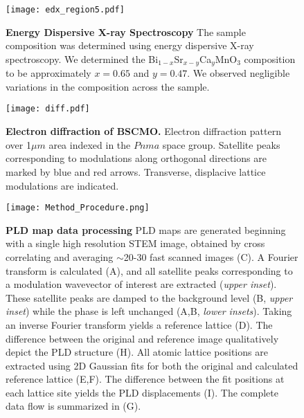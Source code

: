 \documentclass[12pt]{article}
\begin{document}
\clearpage

\begin{figure}
  \texttt{[image: edx\_region5.pdf]}
  \caption{\textbf{Energy Dispersive X-ray Spectroscopy} 
The sample composition was determined using energy dispersive X-ray spectroscopy. We determined the Bi$_{1-x}$Sr$_{x-y}$Ca$_{y}$MnO$_{3}$ composition to be approximately $x=0.65$ and $y=0.47$.  We observed negligible variations in the composition across the sample.}
  \label{F:edx}
\end{figure}

\clearpage

\begin{figure}
  \texttt{[image: diff.pdf]}
  \caption{\textbf{Electron diffraction of BSCMO.} 
Electron diffraction pattern over 1$\mu m$ area indexed in the $Pnma$ space group.
Satellite peaks corresponding to modulations along orthogonal directions are marked by blue and red arrows.
Transverse, displacive lattice modulations are indicated.}
\label{F:Diffraction}
\end{figure}

\clearpage

\begin{figure}
  \texttt{[image: Method\_Procedure.png]}
  \caption{\textbf{PLD map data processing} 
PLD maps are generated beginning with a single high resolution STEM image, obtained by cross correlating and averaging $\sim$20-30 fast scanned images (C).  
A Fourier transform is calculated (A), and all satellite peaks corresponding to a modulation wavevector of interest are extracted (\textit{upper inset}).  
These satellite peaks are damped to the background level (B, \textit{upper inset}) while the phase is left unchanged (A,B, \textit{lower insets}).
Taking an inverse Fourier transform yields a reference lattice (D).
The difference between the original and reference image qualitatively depict the PLD structure (H).
All atomic lattice positions are extracted using 2D Gaussian fits for both the original and calculated reference lattice (E,F).
The difference between the fit positions at each lattice site yields the PLD displacements (I).
The complete data flow is summarized in (G).}
  \label{F:Method_Procedure}
\end{figure}

\clearpage
\end{document}
